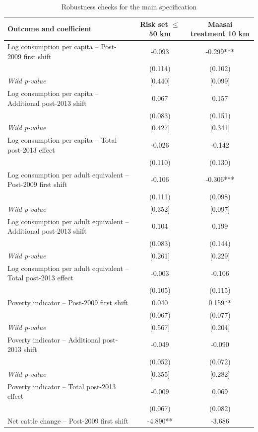 \begin{table}[!htbp]\centering
\caption{Robustness checks for the main specification}
\label{tab:robustness-main}
\scriptsize
\begin{tabular}{lcc}
\toprule
Outcome and coefficient & Risk set $\leq$ 50 km & Maasai treatment 10 km \\
\midrule
Log consumption per capita -- Post-2009 first shift & -0.093 & -0.299*** \\
  & (0.114) & (0.102) \\
\emph{Wild p-value} & [0.440] & [0.099] \\
Log consumption per capita -- Additional post-2013 shift & 0.067 & 0.157 \\
  & (0.083) & (0.151) \\
\emph{Wild p-value} & [0.427] & [0.341] \\
Log consumption per capita -- Total post-2013 effect & -0.026 & -0.142 \\
  & (0.110) & (0.130) \\
\addlinespace
Log consumption per adult equivalent -- Post-2009 first shift & -0.106 & -0.306*** \\
  & (0.111) & (0.098) \\
\emph{Wild p-value} & [0.352] & [0.097] \\
Log consumption per adult equivalent -- Additional post-2013 shift & 0.104 & 0.199 \\
  & (0.083) & (0.144) \\
\emph{Wild p-value} & [0.261] & [0.229] \\
Log consumption per adult equivalent -- Total post-2013 effect & -0.003 & -0.106 \\
  & (0.105) & (0.115) \\
\addlinespace
Poverty indicator -- Post-2009 first shift & 0.040 & 0.159** \\
  & (0.067) & (0.077) \\
\emph{Wild p-value} & [0.567] & [0.204] \\
Poverty indicator -- Additional post-2013 shift & -0.049 & -0.090 \\
  & (0.052) & (0.072) \\
\emph{Wild p-value} & [0.355] & [0.282] \\
Poverty indicator -- Total post-2013 effect & -0.009 & 0.069 \\
  & (0.067) & (0.082) \\
\addlinespace
Net cattle change -- Post-2009 first shift & -4.890** & -3.686 \\

\end{tabular}
\end{table}
